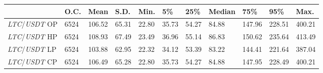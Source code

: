 \begin{tabular}{lllllllllll}
\toprule
 & \textbf{O.C.} & \textbf{Mean} & \textbf{S.D.} & \textbf{Min.} & \textbf{5\%} & \textbf{25\%} & \textbf{Median} & \textbf{75\%} & \textbf{95\%} & \textbf{Max.} \\
\midrule
\emph{LTC}/\emph{USDT} OP & 6524 & 106.52 & 65.31 & 22.80 & 35.73 & 54.27 & 84.88 & 147.96 & 228.51 & 400.21 \\
\emph{LTC}/\emph{USDT} HP & 6524 & 108.93 & 67.49 & 23.49 & 36.96 & 55.14 & 86.83 & 150.62 & 235.64 & 413.49 \\
\emph{LTC}/\emph{USDT} LP & 6524 & 103.88 & 62.95 & 22.32 & 34.12 & 53.39 & 83.22 & 144.41 & 221.64 & 387.04 \\
\emph{LTC}/\emph{USDT} CP & 6524 & 106.49 & 65.28 & 22.80 & 35.73 & 54.27 & 84.88 & 147.95 & 228.49 & 400.21 \\
\bottomrule
\end{tabular}
